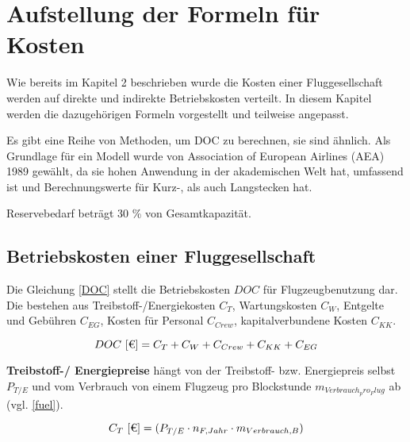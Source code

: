 \section{Aufstellung der Formeln für Kosten}
\label{s:Aufstellung der Formeln für Kosten}

Wie bereits im Kapitel 2 beschrieben wurde die Kosten einer Fluggesellschaft werden auf direkte und indirekte Betriebskosten verteilt.
In diesem Kapitel werden die dazugehörigen Formeln vorgestellt und teilweise angepasst. 

Es gibt eine Reihe von Methoden, um DOC zu berechnen, sie sind ähnlich.
Als Grundlage für ein Modell wurde von Association of European Airlines (AEA) 1989 gewählt, da sie hohen Anwendung in der akademischen Welt hat,
umfassend ist und Berechnungswerte für Kurz-, als auch Langstecken hat.

Reservebedarf beträgt 30 \% von Gesamtkapazität.



\subsection{Betriebskosten einer Fluggesellschaft}

Die Gleichung \eqref{DOC} stellt die Betriebskosten $DOC$ für Flugzeugbenutzung dar. Die bestehen aus Treibstoff-/Energiekosten $C_T$, 
Wartungskosten $C_W$, Entgelte und Gebühren $C_{EG}$, Kosten für Personal $C_{Crew}$, kapitalverbundene Kosten $C_{KK}$.


\begin{equation}
     {DOC ~[\text{€}]} = C_T + C_W + C_{Crew} + C_{KK} + C_{EG} \\
     \label{DOC}
  \end{equation}

\textbf{Treibstoff-/ Energiepreise} hängt von der Treibstoff- bzw. Energiepreis selbst \\ $P_{T/E}$ und vom Verbrauch 
von einem Flugzeug pro Blockstunde $m_{Verbrauch_pro_Flug}$ ab (vgl. \eqref{fuel}).



\begin{equation}
   {C_T ~[\text{€}]} = (P_{T/E} \cdot n_{F,Jahr} \cdot m_{Verbrauch,B}) \\
   \label{fuel}
\end{equation}

